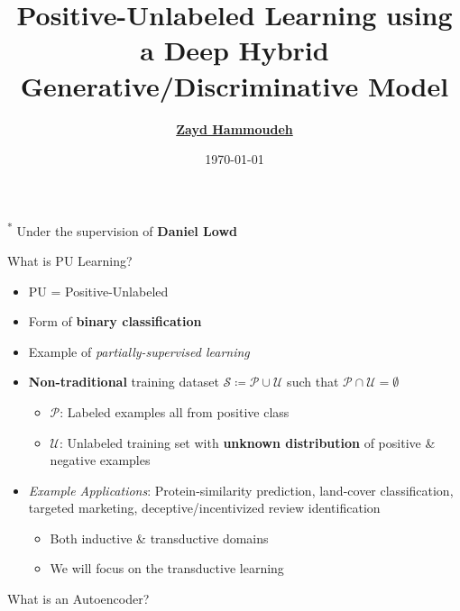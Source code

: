 \documentclass[11pt,dvipsnames,usenames,aspectratio=169]{beamer}  %
\title[Deep Positive-Unlabeled Learning]{Positive-Unlabeled Learning using a Deep Hybrid Generative/Discriminative Model}
\author[Zayd Hammoudeh]{%
  \href{mailto:zayd@cs.uoregon.edu}{\textbf{Zayd Hammoudeh}}\inst{1\textsuperscript{*}}  %
}
\institute[Univ.\ Oregon]{%
  \textsuperscript{1}\textbf{University of Oregon}\\
  Eugene, OR, USA\\
  \texttt{\href{mailto:zayd@cs.uoregon.edu}{zayd@cs.uoregon.edu}}
}
\date{\today}
\DeclarePairedDelimiter{\norm}{\lVert}{\rVert}
\newcommand{\pos}{\mathcal{P}}
\newcommand{\unlabel}{\mathcal{U}}
\newcommand{\blue}[1]{{\color{Blue} #1}}
\newcommand{\red}[1]{{\color{red} #1}}
\newcommand{\green}[1]{{\color{ForestGreen} #1}}
\begin{document}
\begin{frame}
  \titlepage

  \begin{center}
    \textsuperscript{*} Under the supervision of \textbf{Daniel Lowd}
  \end{center}
\end{frame}

\begin{frame}{What is PU Learning?}
  \begin{itemize}[<+->]
    \setlength{\itemsep}{14pt}
    \item PU = Positive-Unlabeled
    \item Form of \blue{\textbf{binary classification}}
    \item Example of \textit{partially-supervised learning}
    \item \green{\textbf{Non-traditional}} training dataset $\mathcal{S} \coloneqq \pos \cup \unlabel$ such that $\pos \cap \unlabel = \emptyset$
      \begin{itemize}[<+->]
        \item $\pos$: Labeled examples all from positive class
        \item $\unlabel$: Unlabeled training set with \blue{\textbf{unknown distribution}} of positive \& negative examples
      \end{itemize}
    \item \textit{Example Applications}: Protein-similarity prediction, land-cover classification, targeted marketing, deceptive/incentivized review identification
      \begin{itemize}[<+->]
        \item Both \blue{inductive} \& \red{transductive} domains
        \item We will focus on the \red{transductive} learning
      \end{itemize}
  \end{itemize}
\end{frame}

\begin{frame}{What is an Autoencoder?}

  \\\vspace{14pt}
  
  \\
\end{frame}
\end{document}
